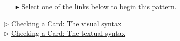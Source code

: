\begin{itemize}
\item[$\blacktriangleright$] Select one of the links below to begin this pattern.
\end{itemize}

\begin{center} {$\triangleright$ \hyperlink{checkCard vis}{Checking a Card: The visual syntax}}\\%
{$\triangleright$ \hyperlink{checkCard tex}{Checking a Card: The textual syntax} }\end{center} 




